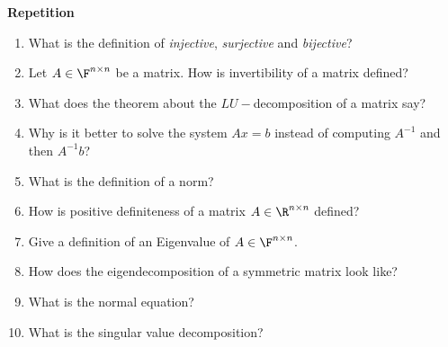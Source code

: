 \textbf{Repetition}
\begin{enumerate}
	\item What is the definition of \textit{injective}, \textit{surjective}
	and \textit{bijective}?
	\item Let $A \in \F ^{n \times n}$ be a matrix. How is invertibility 
	of a matrix defined?
	\item What does the theorem about the $LU-$decomposition of a matrix say?
	\item Why is it better to solve the system $Ax = b$ instead of
	computing $A^{-1}$ and then $A^{-1}b$?
	\item What is the definition of a norm?
	\item How is positive definiteness of a matrix $A \in \R^{n \times n}$ defined?
	\item Give a definition of an Eigenvalue of $A \in \F^{n \times n}$.
	\item How does the eigendecomposition of a symmetric matrix look like?
	\item What is the normal equation?
	\item What is the singular value decomposition?
\end{enumerate}
